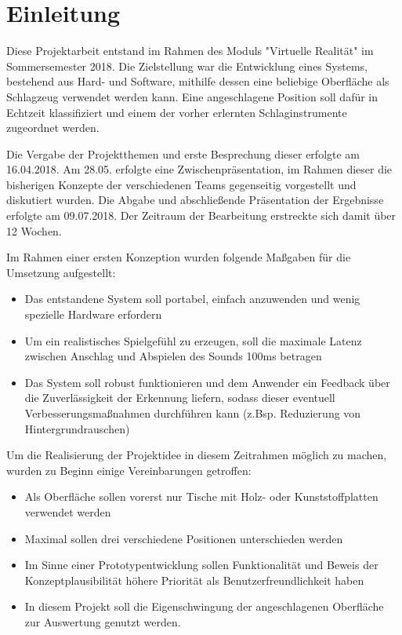 \section{Einleitung}
Diese Projektarbeit entstand im Rahmen des Moduls "Virtuelle Realität" im Sommersemester 2018. 
Die Zielstellung war die Entwicklung eines Systems, bestehend aus Hard- und Software, mithilfe dessen eine beliebige Oberfläche als Schlagzeug verwendet werden kann.
Eine angeschlagene Position soll dafür in Echtzeit klassifiziert und einem der vorher erlernten Schlaginstrumente zugeordnet werden.

Die Vergabe der Projektthemen und erste Besprechung dieser erfolgte am 16.04.2018. Am 28.05. erfolgte eine Zwischenpräsentation, im Rahmen dieser die bisherigen Konzepte der verschiedenen Teams gegenseitig vorgestellt und diskutiert wurden. 
Die Abgabe und abschließende Präsentation der Ergebnisse erfolgte am 09.07.2018. 
Der Zeitraum der Bearbeitung erstreckte sich damit über 12 Wochen.

Im Rahmen einer ersten Konzeption wurden folgende Maßgaben für die Umsetzung aufgestellt:
\begin{itemize}
	\item Das entstandene System soll portabel, einfach anzuwenden und wenig spezielle Hardware erfordern
	\item Um ein realistisches Spielgefühl zu erzeugen, soll die maximale Latenz zwischen Anschlag und Abspielen des Sounds 100ms betragen
	\item Das System soll robust funktionieren und dem Anwender ein Feedback über die Zuverlässigkeit der Erkennung liefern, sodass dieser eventuell Verbesserungsmaßnahmen durchführen kann (z.Bsp. Reduzierung von Hintergrundrauschen)
\end{itemize}

Um die Realisierung der Projektidee in diesem Zeitrahmen möglich zu machen, wurden zu Beginn einige Vereinbarungen getroffen:
\begin{itemize}
	\item Als Oberfläche sollen vorerst nur Tische mit Holz- oder Kunststoffplatten verwendet werden
	\item Maximal sollen drei verschiedene Positionen unterschieden werden
	\item Im Sinne einer Prototypentwicklung sollen Funktionalität und Beweis der Konzeptplausibilität höhere Priorität als Benutzerfreundlichkeit haben
    \item In diesem Projekt soll die Eigenschwingung der angeschlagenen Oberfläche zur Auswertung genutzt werden. 
\end{itemize}


